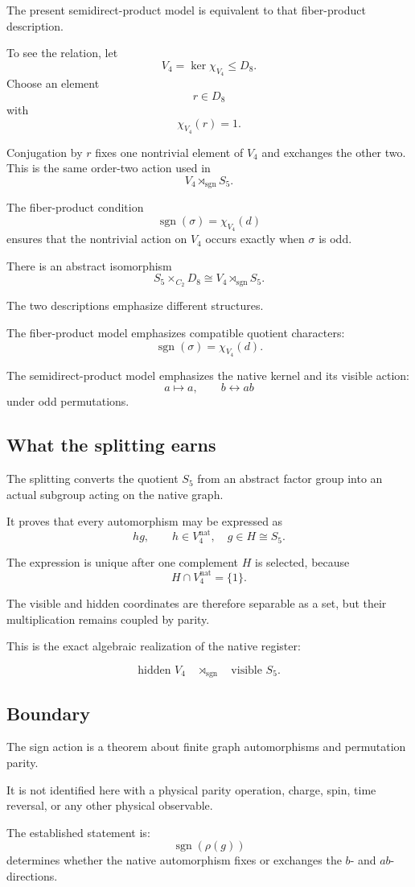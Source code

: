 The present semidirect-product model is equivalent to that
fiber-product description.

To see the relation, let
\[
V_4=\ker\chi_{V_4}\leq D_8.
\]
Choose an element
\[
r\in D_8
\]
with
\[
\chi_{V_4}(r)=1.
\]

Conjugation by \(r\) fixes one nontrivial element of \(V_4\) and
exchanges the other two. This is the same order-two action used in
\[
V_4\rtimes_{\operatorname{sgn}}S_5.
\]

The fiber-product condition
\[
\operatorname{sgn}(\sigma)=\chi_{V_4}(d)
\]
ensures that the nontrivial action on \(V_4\) occurs exactly when
\(\sigma\) is odd.

\begin{proposition}
There is an abstract isomorphism
\[
S_5\times_{C_2}D_8
\cong
V_4\rtimes_{\operatorname{sgn}}S_5.
\]
\end{proposition}

The two descriptions emphasize different structures.

The fiber-product model emphasizes compatible quotient characters:
\[
\operatorname{sgn}(\sigma)=\chi_{V_4}(d).
\]

The semidirect-product model emphasizes the native kernel and its
visible action:
\[
a\mapsto a,
\qquad
b\leftrightarrow ab
\]
under odd permutations.

\subsection{What the splitting earns}

The splitting converts the quotient \(S_5\) from an abstract factor
group into an actual subgroup acting on the native graph.

It proves that every automorphism may be expressed as
\[
hg,
\qquad
h\in V_4^{\mathrm{nat}},
\quad
g\in H\cong S_5.
\]

The expression is unique after one complement \(H\) is selected,
because
\[
H\cap V_4^{\mathrm{nat}}=\{1\}.
\]

The visible and hidden coordinates are therefore separable as a set,
but their multiplication remains coupled by parity.

This is the exact algebraic realization of the native register:

\[
\boxed{
\text{hidden }V_4
\quad\rtimes_{\operatorname{sgn}}\quad
\text{visible }S_5.
}
\]

\subsection{Boundary}

The sign action is a theorem about finite graph automorphisms and
permutation parity.

It is not identified here with a physical parity operation, charge,
spin, time reversal, or any other physical observable.

The established statement is:
\[
\operatorname{sgn}(\rho(g))
\]
determines whether the native automorphism fixes or exchanges the
\(b\)- and \(ab\)-directions.
